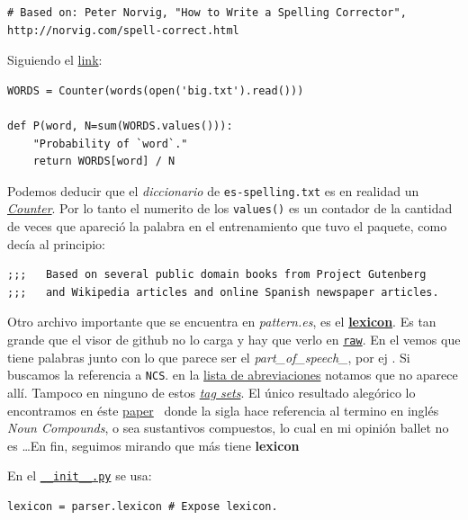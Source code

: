 \begin{verbatim}
# Based on: Peter Norvig, "How to Write a Spelling Corrector", http://norvig.com/spell-correct.html
\end{verbatim}

Siguiendo el \href{http://norvig.com/spell-correct.html}{link}:

\begin{verbatim}
WORDS = Counter(words(open('big.txt').read()))

def P(word, N=sum(WORDS.values())):
    "Probability of `word`."
    return WORDS[word] / N
\end{verbatim}

Podemos deducir que el \emph{diccionario} de 
\texttt{es-spelling.txt} es en realidad un
\href{https://docs.python.org/2/library/collections.html\#collections.Counter}{\emph{Counter}}. Por lo tanto el numerito de los \texttt{values()} es un contador de la cantidad de veces que apareció la palabra en el entrenamiento que tuvo el paquete, como decía al principio:

\begin{verbatim}
;;;   Based on several public domain books from Project Gutenberg
;;;   and Wikipedia articles and online Spanish newspaper articles.
\end{verbatim}

Otro archivo importante que se encuentra en \emph{pattern.es},  es el
\href{https://github.com/clips/pattern/blob/master/pattern/text/es/es-lexicon.txt}{\textbf{lexicon}}.
Es tan grande que el visor de github no lo carga y hay que verlo en
\href{https://raw.githubusercontent.com/clips/pattern/master/pattern/text/es/es-lexicon.txt}{\texttt{raw}}.
En el vemos que tiene palabras junto con lo que parece ser el \emph{part\_of\_speech\_}, por ej . Si buscamos la referencia
a \texttt{NCS}. en la
\href{https://www.clips.uantwerpen.be/pages/MBSP-tags}{lista de abreviaciones}
notamos que no aparece allí. Tampoco en ninguno de estos
\href{https://www.sketchengine.eu/tagsets/english-part-of-speech-tagset/}{\emph{tag
sets}}. El único resultado alegórico lo encontramos en éste
\href{https://www.aclweb.org/anthology/C14-1099}{paper}~\autocite{paperling} donde la sigla hace referencia al termino en inglés \emph{Noun Compounds}, o sea sustantivos compuestos, lo cual en mi opinión ballet no es \ldots  En fin, seguimos mirando que más tiene \textbf{lexicon}

En el
\href{https://github.com/clips/pattern/blob/5b85d998c30ddc6772b56310713530224466083a/pattern/text/es/__init__.py\#L220}{\texttt{\_\_init\_\_.py}}
se usa:
\begin{verbatim}
lexicon = parser.lexicon # Expose lexicon.
\end{verbatim}

